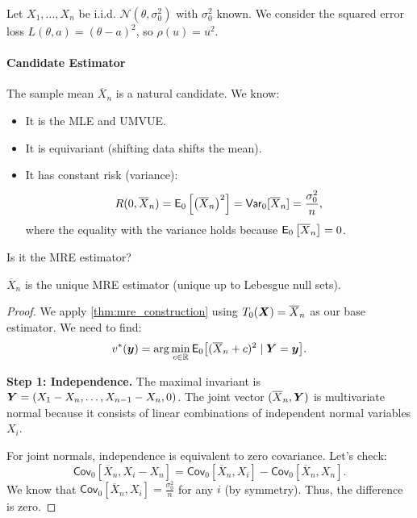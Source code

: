 \medskip

\begin{ex}
\label{ex:gaussian_loc}

Let \(X_1, ..., X_n\) be i.i.d. \(\mathcal{N}(\theta, \sigma_0^2)\) with \(\sigma_0^2\) known. We consider the squared error loss \(L(\theta, a) = (\theta - a)^2\), so \(\rho(u) = u^2\).

\paragraph{Candidate Estimator}
The sample mean \(\overline{X}_n\) is a natural candidate. We know:
\begin{itemize}
\item It is the MLE and UMVUE.
\item It is equivariant (shifting data shifts the mean).
\item It has constant risk (variance):
    \[
        R(0, \overline{X}_n) 
        = \mathsf{E}_{0}\left[\left( \overline{X}_{n} \right) ^2\right] = \mathsf{Var}_0[\overline{X}_n] = \frac{\sigma_0^2}{n},
    \]
    where the equality with the variance holds because \(\mathsf{E}_{0}\left[\overline{X}_{n}\right] =0\).
\end{itemize}

Is it the MRE estimator?

\begin{claim}
\(\overline{X}_n\) is the unique MRE estimator (unique up to Lebesgue null sets).
\end{claim}

\begin{proof}
We apply \autoref{thm:mre_construction} using \(T_0(\boldsymbol{X}) = \overline{X}_n\) as our base estimator. We need to find:
\[
v^*(\boldsymbol{y}) = \arg\min_{c \in \mathbb{R}} \mathsf{E}_0 \big[ (\overline{X}_n + c)^2 \mid \boldsymbol{Y} = \boldsymbol{y} \big].
\]

\textbf{Step 1: Independence.}
The maximal invariant is \(\boldsymbol{Y} = (X_1 - X_n, \dots, X_{n-1} - X_n, 0)\). The joint vector \((\overline{X}_n, \boldsymbol{Y})\) is multivariate normal because it consists of linear combinations of independent normal variables \(X_i\).

For joint normals, independence is equivalent to zero covariance. Let's check:
\[
\mathsf{Cov}_0[\overline{X}_n, X_i - X_n] = \mathsf{Cov}_0[\overline{X}_n, X_i] - \mathsf{Cov}_0[\overline{X}_n, X_n].
\]
We know that \(\mathsf{Cov}_0[\overline{X}_n, X_i] = \frac{\sigma_0^2}{n}\) for any \(i\) (by symmetry). Thus, the difference is zero.


\end{proof}
\end{ex}
